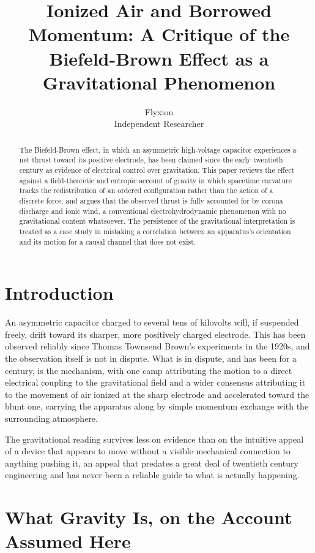 \documentclass[11pt]{article}
\title{Ionized Air and Borrowed Momentum: A Critique of the Biefeld-Brown Effect as a Gravitational Phenomenon}
\author{Flyxion \\ \small Independent Researcher}
\date{}
\begin{document}
\maketitle

\begin{abstract}
The Biefeld-Brown effect, in which an asymmetric high-voltage capacitor experiences a net thrust toward its positive electrode, has been claimed since the early twentieth century as evidence of electrical control over gravitation. This paper reviews the effect against a field-theoretic and entropic account of gravity in which spacetime curvature tracks the redistribution of an ordered configuration rather than the action of a discrete force, and argues that the observed thrust is fully accounted for by corona discharge and ionic wind, a conventional electrohydrodynamic phenomenon with no gravitational content whatsoever. The persistence of the gravitational interpretation is treated as a case study in mistaking a correlation between an apparatus's orientation and its motion for a causal channel that does not exist.
\end{abstract}

\section{Introduction}

An asymmetric capacitor charged to several tens of kilovolts will, if suspended freely, drift toward its sharper, more positively charged electrode. This has been observed reliably since Thomas Townsend Brown's experiments in the 1920s, and the observation itself is not in dispute. What is in dispute, and has been for a century, is the mechanism, with one camp attributing the motion to a direct electrical coupling to the gravitational field and a wider consensus attributing it to the movement of air ionized at the sharp electrode and accelerated toward the blunt one, carrying the apparatus along by simple momentum exchange with the surrounding atmosphere.

The gravitational reading survives less on evidence than on the intuitive appeal of a device that appears to move without a visible mechanical connection to anything pushing it, an appeal that predates a great deal of twentieth century engineering and has never been a reliable guide to what is actually happening.

\section{What Gravity Is, on the Account Assumed Here}
\end{document}
